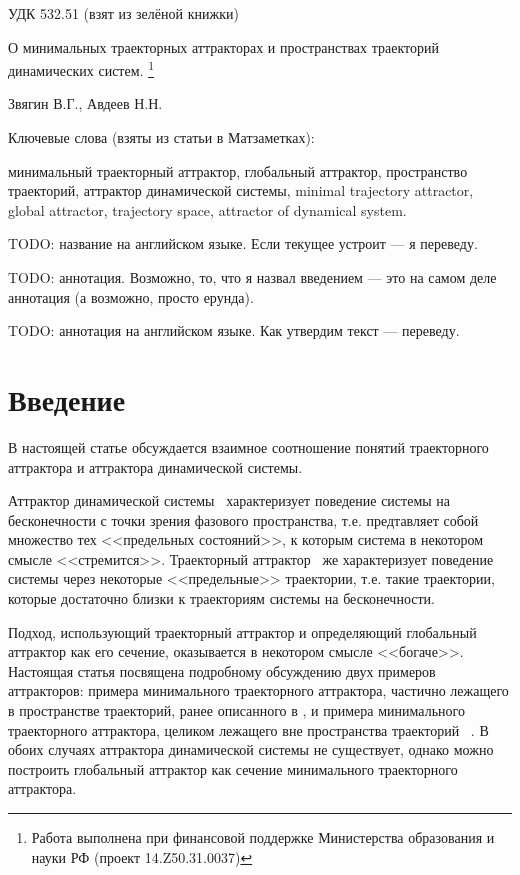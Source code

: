 \documentclass[a4paper]{article} %
\begin{document}
УДК 532.51 (взят из зелёной книжки)


О минимальных траекторных аттракторах и пространствах траекторий динамических систем.
\footnote{
	Работа выполнена при финансовой поддержке Министерства образования и науки РФ
	(проект 14.Z50.31.0037)
}

Звягин В.Г., Авдеев Н.Н.

Ключевые слова (взяты из статьи в Матзаметках):

минимальный траекторный аттрактор, глобальный аттрактор, пространство траекторий, аттрактор динамической системы,
minimal trajectory attractor, global attractor, trajectory space, attractor of dynamical system.


TODO: название на английском языке. Если текущее устроит --- я переведу.

TODO: аннотация. Возможно, то, что я назвал введением --- это на самом деле аннотация
(а возможно, просто ерунда).

TODO: аннотация на английском языке. Как утвердим текст --- переведу.


\section{Введение}
В настоящей статье обсуждается взаимное соотношение понятий траекторного аттрактора и аттрактора динамической системы.

Аттрактор динамической системы~\cite{Vishik}
характеризует поведение системы на бесконечности с точки зрения фазового пространства,
т.е. предтавляет собой множество тех <<предельных состояний>>, к которым система в некотором смысле <<стремится>>.
Траекторный аттрактор~\cite{Vorotnikov,Kondratyev} же характеризует поведение системы
через некоторые <<предельные>> траектории, т.е. такие траектории,
которые достаточно близки к траекториям системы на бесконечности.

Подход, использующий траекторный аттрактор и определяющий глобальный аттрактор как его сечение,
оказывается в некотором смысле <<богаче>>.
Настоящая статья посвящена подробному обсуждению двух примеров аттракторов:
примера минимального траекторного аттрактора,
частично лежащего в пространстве траекторий, ранее описанного в \cite{Zelenaya},
и примера минимального траекторного аттрактора, целиком лежащего вне пространства траекторий
~\cite{mzmZvAv,vvmshZvAv}.
В обоих случаях аттрактора динамической системы не существует,
однако можно построить глобальный аттрактор как сечение минимального траекторного аттрактора.
\end{document}
